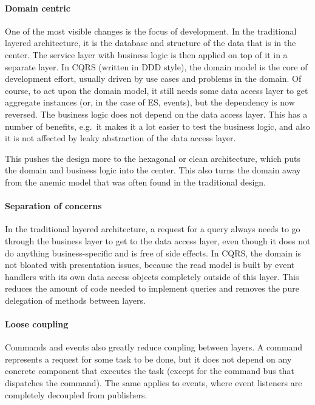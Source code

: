 \documentclass{book}
\begin{document}
\paragraph{Domain centric}\label{domain-centric}

One of the most visible changes is the focus of development. In the
traditional layered architecture, it is the database and structure of
the data that is in the center. The service layer with business logic is
then applied on top of it in a separate layer. In CQRS (written in DDD
style), the domain model is the core of development effort, usually
driven by use cases and problems in the domain. Of course, to act upon
the domain model, it still needs some data access layer to get aggregate
instances (or, in the case of ES, events), but the dependency is now
reversed. The business logic does not depend on the data access layer.
This has a number of benefits, e.g.~it makes it a lot easier to test the
business logic, and also it is not affected by leaky abstraction of the
data access layer.

This pushes the design more to the hexagonal \cite{hex} or clean
\cite{clean} architecture, which puts the domain and business logic into
the center. This also turns the domain away from the anemic model that
was often found in the traditional design.

\paragraph{Separation of concerns}\label{separation-of-concerns}

In the traditional layered architecture, a request for a query always
needs to go through the business layer to get to the data access layer,
even though it does not do anything business-specific and is free of
side effects. In CQRS, the domain is not bloated with presentation
issues, because the read model is built by event handlers with its own
data access objects completely outside of this layer. This reduces the
amount of code needed to implement queries and removes the pure
delegation of methods between layers.

\paragraph{Loose coupling}\label{loose-coupling}

Commands and events also greatly reduce coupling between layers. A
command represents a request for some task to be done, but it does not
depend on any concrete component that executes the task (except for the
command bus that dispatches the command). The same applies to events,
where event listeners are completely decoupled from publishers.
\end{document}

